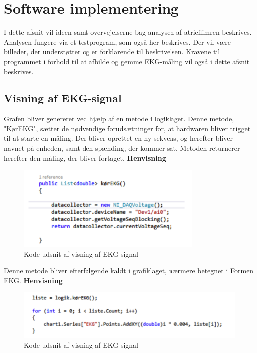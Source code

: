 \section{Software implementering}
I dette afsnit vil ideen samt overvejelserne bag analysen af atrieflimren beskrives. Analysen fungere via et testprogram, som også her beskrives. Der vil være billeder, der understøtter og er forklarende til beskrivelsen. Kravene til programmet i forhold til at afbilde og gemme EKG-måling vil også i dette afsnit beskrives. 

\subsection{Visning af EKG-signal}
Grafen bliver genereret ved hjælp af en metode i logiklaget. Denne metode, "KørEKG", sætter de nødvendige forudsætninger for, at hardwaren bliver trigget til at starte en måling. Der bliver oprettet en ny sekvens, og herefter bliver navnet på enheden, samt den spænding, der kommer sat. Metoden returnerer herefter den måling, der bliver fortaget. \textbf{Henvisning}

\begin{figure}[H]
	\centering
	\includegraphics[width=0.8\textwidth]{Figurer/Snip20150525_39}
	\caption{Kode udsnit af visning af EKG-signal}
\end{figure}

Denne metode bliver efterfølgende kaldt i grafiklaget, nærmere betegnet i Formen EKG. \textbf{Henvisning}

\begin{figure}[H]
	\centering
	\includegraphics[width=1\textwidth]{Figurer/Snip20150525_40}
	\caption{Kode udsnit af visning af EKG-signal}
\end{figure}

